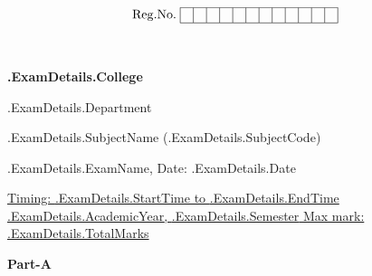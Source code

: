 \documentclass[12pt, a4paper]{exam}
\begin{document}
\hspace{0.75in}
\begin{minipage}[c]{0.8\textwidth}
	\begin{adjustwidth}{\dimexpr\linewidth-3.5cm}{\dimexpr\linewidth-0.80cm} 
	\[
		\mathrm{Reg.No.}    \hspace{0.1cm}
\begin{array}{|*{12}{c|}}
\hline
 & & & & & & & & & & & \\
\hline
\end{array}
\]
\end{adjustwidth}
	\begin{center}
		 \\
		{\large	\textbf {{.ExamDetails.College}} \par
		\large	{{.ExamDetails.Department}}	\par
	\large { {{.ExamDetails.SubjectName}} ({{.ExamDetails.SubjectCode}})}	\par
\small	{{.ExamDetails.ExamName}}, Date: {{.ExamDetails.Date}}}
	\end{center}
\end{minipage}
\par
\vspace{0.2in}
\noindent
\uline{Timing: {{.ExamDetails.StartTime}} to {{.ExamDetails.EndTime}}	\hfill {{.ExamDetails.AcademicYear}}, {{.ExamDetails.Semester}}		\hfill Max mark: {{.ExamDetails.TotalMarks}}}
\par 
\vspace{0.25in}
\centering
\hspace{1.55in}
{\medium \bfseries Part-A }
\newline
\end{document}
